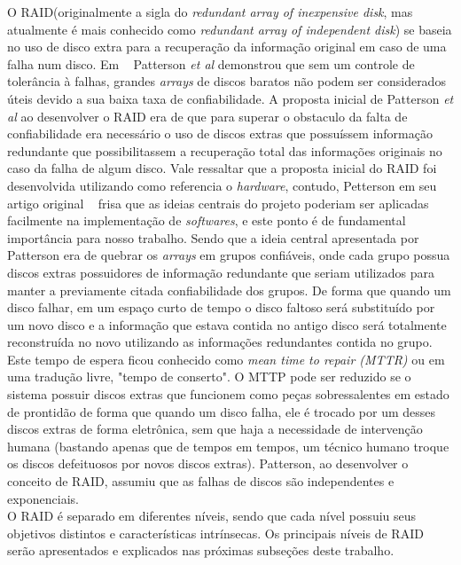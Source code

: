 		O RAID(originalmente a sigla do \textit{redundant array of inexpensive disk}, mas atualmente é mais conhecido como \textit{redundant array of independent disk}) se baseia no uso de disco extra para a recuperação da informação original em caso de uma falha num disco. Em ~\cite{patterson88} Patterson \textit{et al} demonstrou que sem um controle de tolerância à falhas, grandes \textit{arrays} de discos baratos não podem ser considerados úteis devido a sua baixa taxa de confiabilidade. A proposta inicial de Patterson \textit{et al} ao desenvolver o RAID era de que para superar o obstaculo da falta de confiabilidade era necessário o uso de discos extras que possuíssem informação redundante que possibilitassem a recuperação total das informações originais no caso da falha de algum disco. Vale ressaltar que a proposta inicial do RAID foi desenvolvida utilizando como referencia o \textit{hardware}, contudo, Petterson em seu artigo original ~\cite{patterson88} frisa que as ideias centrais do projeto poderiam ser aplicadas facilmente na implementação de \textit{softwares}, e este ponto é de fundamental importância para nosso trabalho. Sendo que a ideia central apresentada por Patterson era de quebrar os \textit{arrays} em grupos confiáveis, onde cada grupo possua discos extras possuidores de informação redundante que seriam utilizados para manter a previamente citada confiabilidade dos grupos. De forma que quando um disco falhar, em um espaço curto de tempo o disco faltoso será substituído por um novo disco e a informação que estava contida no antigo disco será totalmente reconstruída no novo utilizando as informações redundantes contida no grupo. Este tempo de espera ficou conhecido como \textit{mean time to repair (MTTR)} ou em uma tradução livre, "tempo de conserto". O MTTP pode ser reduzido se o sistema possuir discos extras que funcionem como peças sobressalentes em estado de prontidão de forma que quando um disco falha, ele é trocado por um desses discos extras de forma eletrônica, sem que haja a necessidade de intervenção humana (bastando apenas que de tempos em tempos, um técnico humano troque os discos defeituosos por novos discos extras). Patterson, ao desenvolver o conceito de RAID, assumiu que as falhas de discos são independentes e exponenciais. \\
		
		O RAID é separado em diferentes níveis, sendo que cada nível possuiu seus objetivos distintos e características intrínsecas. Os principais níveis de RAID serão apresentados e explicados nas próximas subseções deste trabalho.
		\\
		
